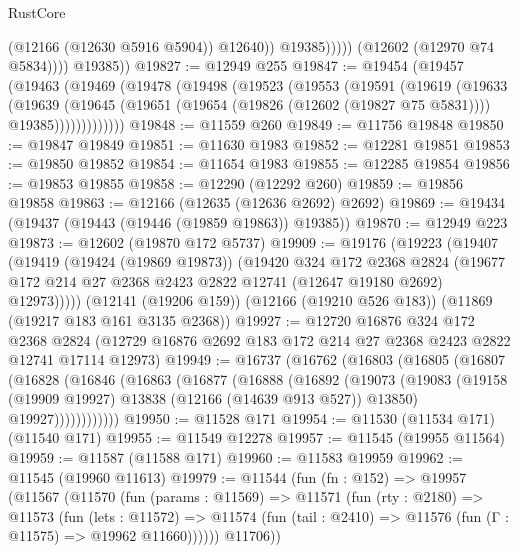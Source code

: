\begin{lexlean}{RustCore}
\begin{coremodule}
                          (@12166 (@12630 @5916 @5904))
                          @12640))
                      @19385)))))
            (@12602 (@12970 @74 @5834))))
        @19385))
@19827 := @12949 @255
@19847 := @19454
    (@19457
      (@19463
        (@19469
          (@19478
            (@19498
              (@19523
                (@19553
                  (@19591
                    (@19619
                      (@19633
                        (@19639
                          (@19645
                            (@19651
                              (@19654 (@19826 (@12602 (@19827 @75 @5831))))
                              @19385)))))))))))))
@19848 := @11559 @260
@19849 := @11756 @19848
@19850 := @19847 @19849
@19851 := @11630 @1983
@19852 := @12281 @19851
@19853 := @19850 @19852
@19854 := @11654 @1983
@19855 := @12285 @19854
@19856 := @19853 @19855
@19858 := @12290 (@12292 @260)
@19859 := @19856 @19858
@19863 := @12166 (@12635 (@12636 @2692) @2692)
@19869 := @19434 (@19437 (@19443 (@19446 (@19859 @19863)) @19385))
@19870 := @12949 @223
@19873 := @12602 (@19870 @172 @5737)
@19909 := @19176
    (@19223
      (@19407
        (@19419
          (@19424 (@19869 @19873))
          (@19420
            @324
            @172
            @2368
            @2824
            (@19677 @172 @214 @27 @2368 @2423 @2822 @12741 (@12647 @19180 @2692) @12973)))))
    (@12141 (@19206 @159))
    (@12166 (@19210 @526 @183))
    (@11869 (@19217 @183 @161 @3135 @2368))
@19927 := @12720
    @16876
    @324
    @172
    @2368
    @2824
    (@12729 @16876 @2692 @183 @172 @214 @27 @2368 @2423 @2822 @12741 @17114 @12973)
@19949 := @16737
    (@16762
      (@16803
        (@16805
          (@16807
            (@16828
              (@16846
                (@16863
                  (@16877
                    (@16888
                      (@16892
                        (@19073
                          (@19083
                            (@19158 (@19909 @19927) @13838 (@12166 (@14639 @913 @527)) @13850)
                            @19927))))))))))))
@19950 := @11528 @171
@19954 := @11530 (@11534 @171) (@11540 @171)
@19955 := @11549 @12278
@19957 := @11545 (@19955 @11564)
@19959 := @11587 (@11588 @171)
@19960 := @11583 @19959
@19962 := @11545 (@19960 @11613)
@19979 := @11544
    (fun (fn : @152) =>
    @19957
      (@11567
        (@11570
          (fun (params : @11569) =>
          @11571
            (fun (rty : @2180) =>
            @11573
              (fun (lets : @11572) =>
              @11574 (fun (tail : @2410) => @11576 (fun (Γ : @11575) => @19962 @11660))))))
        @11706))

\end{coremodule}
\end{lexlean}
